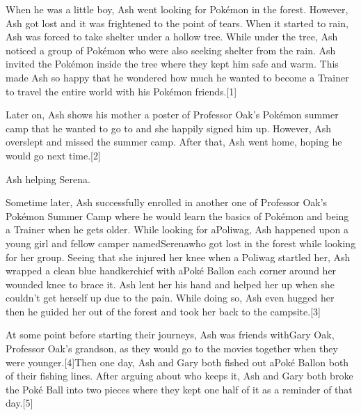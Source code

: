\documentclass[a4paper,12pt]{article}
\begin{document}
When he was a little boy, Ash went looking for Pokémon in the forest. However, Ash got lost and it was frightened to the point of tears. When it started to rain, Ash was forced to take shelter under a hollow tree. While under the tree, Ash noticed a group of Pokémon who were also seeking shelter from the rain. Ash invited the Pokémon inside the tree where they kept him safe and warm. This made Ash so happy that he wondered how much he wanted to become a Trainer to travel the entire world with his Pokémon friends.[1]\\ \par \vspace{0.5cm}

Later on, Ash shows his mother a poster of Professor Oak's Pokémon summer camp that he wanted to go to and she happily signed him up. However, Ash overslept and missed the summer camp. After that, Ash went home, hoping he would go next time.[2]\\ \par \vspace{0.5cm}

Ash helping Serena.\\ \par \vspace{0.5cm}

Sometime later, Ash successfully enrolled in another one of Professor Oak's Pokémon Summer Camp where he would learn the basics of Pokémon and being a Trainer when he gets older. While looking for aPoliwag, Ash happened upon a young girl and fellow camper namedSerenawho got lost in the forest while looking for her group. Seeing that she injured her knee when a Poliwag startled her, Ash wrapped a clean blue handkerchief with aPoké Ballon each corner around her wounded knee to brace it. Ash lent her his hand and helped her up when she couldn't get herself up due to the pain. While doing so, Ash even hugged her then he guided her out of the forest and took her back to the campsite.[3]\\ \par \vspace{0.5cm}

At some point before starting their journeys, Ash was friends withGary Oak, Professor Oak's grandson, as they would go to the movies together when they were younger.[4]Then one day,
Ash and Gary both fished out aPoké Ballon both of their fishing lines. After arguing about who keeps it, Ash and Gary both broke the Poké Ball into two pieces where they kept one half of it as a reminder of that day.[5]\\ \par \vspace{0.5cm}
\end{document}
